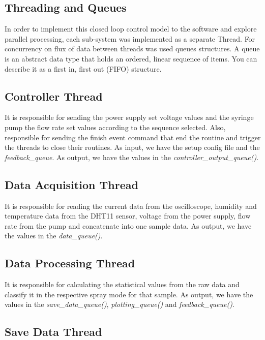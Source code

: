 \subsection{Threading and Queues}
\label{subsec:concurrency}

    In order to implement this closed loop control model to the software and explore parallel processing, each sub-system was implemented as a separate Thread.
    For concurrency on flux of data between threads was used queues structures.
    A queue is an abstract data type that holds an ordered, linear sequence of items. You can describe it as a first in, first out (FIFO) structure.

    
    \subsection{Controller Thread}

        It is responsible for sending the power supply set voltage values and the syringe pump the flow rate set values according to the sequence selected.
        Also, responsible for sending the finish event command that end the routine and trigger the threads to close their routines.
        As input, we have the setup config file and the \emph{feedback\_queue}. As output, we have the values in the \emph{controller\_output\_queue()}.

    \subsection{Data Acquisition Thread}
    \label{subsec:data_aquisition}

        It is responsible for reading the current data from the oscilloscope, humidity and temperature data from the DHT11 sensor, voltage from the power supply, flow rate from the pump and concatenate into one sample data.
        As output, we have the values in the \emph{data\_queue()}.

    \subsection{Data Processing Thread}

        It is responsible for calculating the statistical values from the raw data and classify it in the respective spray mode for that sample.
        As output, we have the values in the \emph{save\_data\_queue()}, \emph{plotting\_queue()} and \emph{feedback\_queue()}.
    
    \subsection{Save Data Thread}
    \label{subsec:save_thread}

